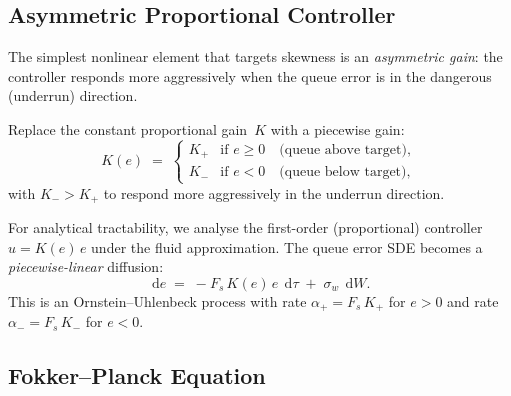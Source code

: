 \documentclass[11pt, a4paper]{article}
\theoremstyle{definition}
\theoremstyle{plain}
\theoremstyle{remark}
\newcommand{\dd}{\,\mathrm{d}}                   %
\begin{document}
\subsection{Asymmetric Proportional Controller}%
\label{sec:asym-controller}

The simplest nonlinear element that targets skewness is an
\emph{asymmetric gain}: the controller responds more aggressively
when the queue error is in the dangerous (underrun) direction.

Replace the constant proportional gain~$K$ with a piecewise gain:
\begin{equation}\label{eq:asym-gain}
  K(e) \;=\;
  \begin{cases}
    K_+ & \text{if } e \geq 0 \quad\text{(queue above target)},\\[4pt]
    K_- & \text{if } e < 0   \quad\text{(queue below target)},
  \end{cases}
\end{equation}
with $K_- > K_+$ to respond more aggressively in the underrun
direction.

For analytical tractability, we analyse the first-order
(proportional) controller $u = K(e)\,e$ under the fluid
approximation.  The queue error SDE becomes a
\emph{piecewise-linear} diffusion:
\begin{equation}\label{eq:asym-sde}
  \dd e \;=\; -F_s\,K(e)\,e\;\dd\tau
            \;+\; \sigma_w\;\dd W.
\end{equation}
This is an Ornstein--Uhlenbeck process with rate
$\alpha_+ = F_s\,K_+$ for $e > 0$ and rate
$\alpha_- = F_s\,K_-$ for $e < 0$.

\subsection{Fokker--Planck Equation}%
\label{sec:fokker-planck}
\end{document}
